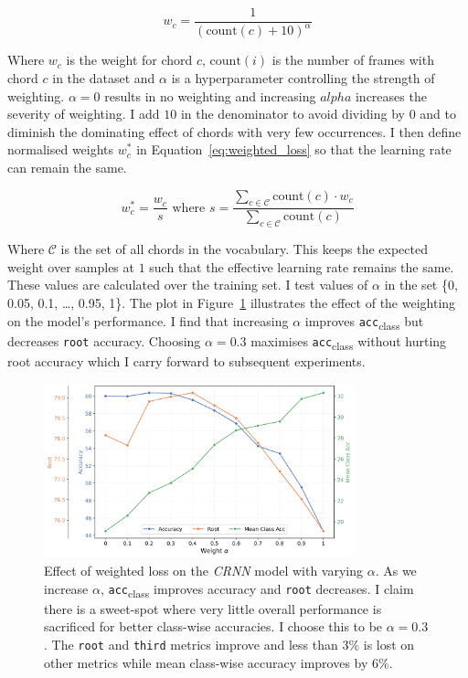 \begin{equation}\label{eq:weighting}
    w_c = \frac{1}{{(\text{count}(c) + 10)}^\alpha}
\end{equation}

Where $w_c$ is the weight for chord $c$, $\text{count}(i)$ is the number of frames with chord $c$ in the dataset and $\alpha$ is a hyperparameter controlling the strength of weighting. $\alpha=0$ results in no weighting and increasing $alpha$ increases the severity of weighting. I add $10$ in the denominator to avoid dividing by $0$ and to diminish the dominating effect of chords with very few occurrences. I then define normalised weights $w_c^*$ in Equation~\ref{eq:weighted_loss} so that the learning rate can remain the same.

\begin{equation}\label{eq:weighted_loss}
    w_c^* = \frac{w_c}{s} \text{ where } s = \frac{\sum_{c\in \mathcal{C}} \text{count}(c)\cdot w_c}{\sum_{c\in \mathcal{C}} \text{count}(c)}
\end{equation}

Where $\mathcal{C}$ is the set of all chords in the vocabulary. This keeps the expected weight over samples at $1$ such that the effective learning rate remains the same. These values are calculated over the training set. I test values of $\alpha$ in the set \{0, 0.05, 0.1, \ldots, 0.95, 1\}. The plot in Figure~\ref{fig:weighted_loss} illustrates the effect of the weighting on the model's performance. I find that increasing $\alpha$ improves \texttt{acc}\textsubscript{class} but decreases \texttt{root} accuracy. Choosing $\alpha = 0.3$ maximises \texttt{acc}\textsubscript{class} without hurting root accuracy which I carry forward to subsequent experiments.

\begin{figure}[H]
    \centering
    \includegraphics[width=0.8\textwidth]{figures/weight_alpha_search_trim.png}
    \caption{Effect of weighted loss on the \emph{CRNN} model with varying $\alpha$. As we increase $\alpha$, \texttt{acc}\textsubscript{class} improves accuracy and \texttt{root} decreases. I claim there is a sweet-spot where very little overall performance is sacrificed for better class-wise accuracies. I choose this to be $\alpha = 0.3$. The \texttt{root} and \texttt{third} metrics improve and less than $3\%$ is lost on other metrics while mean class-wise accuracy improves by $6\%$.}\label{fig:weighted_loss}
\end{figure}

